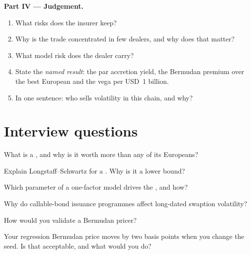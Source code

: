 \begin{problem}
\medskip\noindent\textbf{Part IV --- Judgement.}
\begin{enumerate}[resume]
\item What risks does the insurer keep?
\item Why is the trade concentrated in few dealers, and why does that matter?
\item What model risk does the dealer carry?
\item State the \emph{named result}: the par accretion yield, the Bermudan premium over
the best European and the vega per USD~1 billion.
\item In one sentence: who sells volatility in this chain, and why?
\end{enumerate}
\end{problem}

\section{Interview questions}

\begin{interviewq}\label{iq:rc:bermudans-and-callables:1}
What is a , and why is it worth more than any of its Europeans?
\end{interviewq}

\begin{interviewq}\label{iq:rc:bermudans-and-callables:2}
Explain Longstaff--Schwartz for a . Why is it a lower bound?
\end{interviewq}

\begin{interviewq}\label{iq:rc:bermudans-and-callables:3}
Which parameter of a one-factor model drives the , and how?
\end{interviewq}

\begin{interviewq}\label{iq:rc:bermudans-and-callables:4}
Why do callable-bond issuance programmes affect long-dated swaption volatility?
\end{interviewq}

\begin{interviewq}\label{iq:rc:bermudans-and-callables:5}
How would you validate a Bermudan pricer?
\end{interviewq}

\begin{interviewq}\label{iq:rc:bermudans-and-callables:6}
Your regression Bermudan price moves by two basis points when you change the
seed. Is that acceptable, and what would you do?
\end{interviewq}
